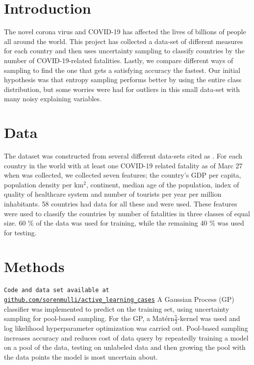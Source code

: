 \documentclass[fleqn]{article}
\begin{document}
\begin{multicols}{2}
	
	
	\section{Introduction} %
	The novel corona virus and COVID-19 has affected the lives of billions of people all around the world. This project has collected a data-set of different measures for each country and then uses uncertainty sampling to classify countries by the number of COVID-19-related fatalities. Lastly, we compare different ways of sampling to find the one that gets a satisfying accuracy the fastest. Our initial hypothesis was that entropy sampling performs better by using the entire class distribution, but some worries were had for outliers in this small data-set with many noisy explaining variables. 
	
	\section{Data}
	The dataset was constructed from several different data-sets cited as \cite{density, corona, alder, bnp, region, healthcare, turist}. For each country in the world with at least one COVID-19 related fatality as of Marc 27 when \cite{corona} was collected, we collected seven features; the country's GDP per capita, population density per km$^2$, continent, median age of the population, index of quality of healthcare system and number of tourists per year per million inhabitants. 58 countries had data for all these and were used. These features were used to classify the countries by number of fatalities in three classes of equal size. 60 \% of the data was used for training, while the remaining 40 \% was used for testing. %

	\section{Methods}
	\texttt{Code and data set available at \url{github.com/sorenmulli/active_learning_cases}} \newline
	A Gaussian Process (GP) classifier was implemented to predict on the training set, using uncertainty sampling for pool-based sampling. For the GP, a Matérn$\frac{5}{2}$-kernel was used and log likelihood hyperparameter optimization was carried out. Pool-based sampling increases accuracy and reduces cost of data query by repeatedly training a model on a pool of the data, testing on unlabeled data and then growing the pool with the data points the model is most uncertain about. 


\end{multicols}
\end{document}
